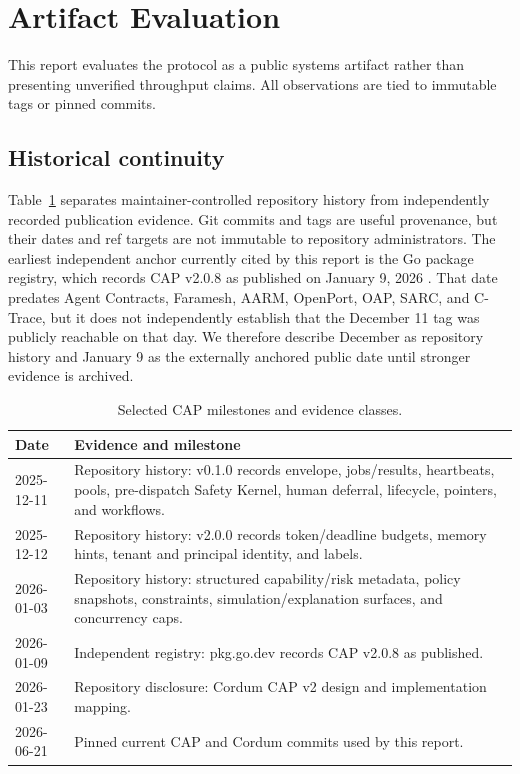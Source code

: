 \section{Artifact Evaluation}

This report evaluates the protocol as a public systems artifact rather than presenting unverified throughput claims. All observations are tied to immutable tags or pinned commits.

\subsection{Historical continuity}

Table~\ref{tab:timeline} separates maintainer-controlled repository history from independently recorded publication evidence. Git commits and tags are useful provenance, but their dates and ref targets are not immutable to repository administrators. The earliest independent anchor currently cited by this report is the Go package registry, which records CAP v2.0.8 as published on January 9, 2026 \citep{cap_pkg_registry}. That date predates Agent Contracts, Faramesh, AARM, OpenPort, OAP, SARC, and C-Trace, but it does not independently establish that the December 11 tag was publicly reachable on that day. We therefore describe December as repository history and January 9 as the externally anchored public date until stronger evidence is archived.

\begin{table}[t]
\centering
\caption{Selected CAP milestones and evidence classes.}
\label{tab:timeline}
\small
\begin{tabular}{@{}p{}p{}@{}}
\toprule
Date & Evidence and milestone \\
\midrule
2025-12-11 & Repository history: v0.1.0 records envelope, jobs/results, heartbeats, pools, pre-dispatch Safety Kernel, human deferral, lifecycle, pointers, and workflows. \\
2025-12-12 & Repository history: v2.0.0 records token/deadline budgets, memory hints, tenant and principal identity, and labels. \\
2026-01-03 & Repository history: structured capability/risk metadata, policy snapshots, constraints, simulation/explanation surfaces, and concurrency caps. \\
2026-01-09 & Independent registry: pkg.go.dev records CAP v2.0.8 as published. \\
2026-01-23 & Repository disclosure: Cordum CAP v2 design and implementation mapping. \\
2026-06-21 & Pinned current CAP and Cordum commits used by this report. \\
\bottomrule
\end{tabular}
\end{table}

